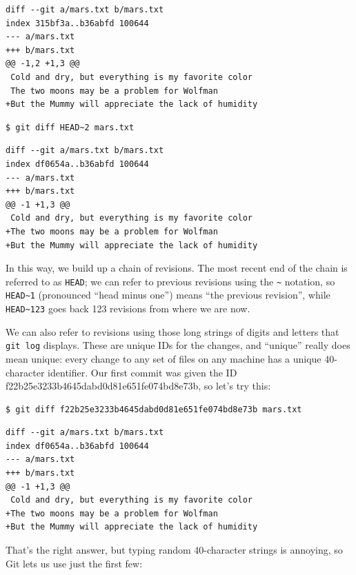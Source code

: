 \documentclass{book}
\begin{document}
\begin{verbatim}
diff --git a/mars.txt b/mars.txt
index 315bf3a..b36abfd 100644
--- a/mars.txt
+++ b/mars.txt
@@ -1,2 +1,3 @@
 Cold and dry, but everything is my favorite color
 The two moons may be a problem for Wolfman
+But the Mummy will appreciate the lack of humidity
\end{verbatim}

\begin{verbatim}
$ git diff HEAD~2 mars.txt
\end{verbatim}

\begin{verbatim}
diff --git a/mars.txt b/mars.txt
index df0654a..b36abfd 100644
--- a/mars.txt
+++ b/mars.txt
@@ -1 +1,3 @@
 Cold and dry, but everything is my favorite color
+The two moons may be a problem for Wolfman
+But the Mummy will appreciate the lack of humidity
\end{verbatim}

In this way, we build up a chain of revisions. The most recent end of
the chain is referred to as \texttt{HEAD}; we can refer to previous
revisions using the \texttt{\textasciitilde{}} notation, so
\texttt{HEAD\textasciitilde{}1} (pronounced ``head minus one'') means
``the previous revision'', while \texttt{HEAD\textasciitilde{}123} goes
back 123 revisions from where we are now.

We can also refer to revisions using those long strings of digits and
letters that \texttt{git log} displays. These are unique IDs for the
changes, and ``unique'' really does mean unique: every change to any set
of files on any machine has a unique 40-character identifier. Our first
commit was given the ID f22b25e3233b4645dabd0d81e651fe074bd8e73b, so
let's try this:

\begin{verbatim}
$ git diff f22b25e3233b4645dabd0d81e651fe074bd8e73b mars.txt
\end{verbatim}

\begin{verbatim}
diff --git a/mars.txt b/mars.txt
index df0654a..b36abfd 100644
--- a/mars.txt
+++ b/mars.txt
@@ -1 +1,3 @@
 Cold and dry, but everything is my favorite color
+The two moons may be a problem for Wolfman
+But the Mummy will appreciate the lack of humidity
\end{verbatim}

That's the right answer, but typing random 40-character strings is
annoying, so Git lets us use just the first few:
\end{document}
